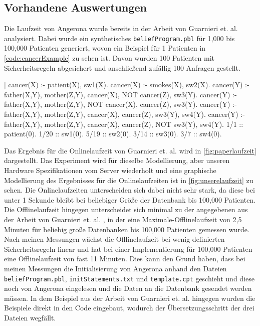 \documentclass[german,version-2020-11]{uzl-thesis}
\begin{document}
\subsection{Vorhandene Auswertungen}
Die Laufzeit von Angerona wurde bereits in der Arbeit von Guarnieri et. al. \cite{guarnieri2017securing} analysiert. Dabei wurde ein synthetisches \texttt{beliefProgram.pbl} für 1,000 bis 100,000 Patienten generiert, wovon ein Beispiel für 1 Patienten in \autoref{code:cancerExample} zu sehen ist. Davon wurden 100 Patienten mit Sicherheitsregeln abgesichert und anschließend zufällig 100 Anfragen gestellt. \\ 
\begin{Pseudocode}[caption={\texttt{beliefProgram.pbl} für das Beispiel aus \cite{6}}, label={code:cancerExample}]]
cancer(X) :- patient(X), sw1(X).
cancer(X) :- smokes(X), sw2(X).
cancer(Y) :- father(X,Y), mother(Z,Y), cancer(X), NOT cancer(Z), sw3(Y).
cancer(Y) :- father(X,Y), mother(Z,Y), NOT cancer(X), cancer(Z), sw3(Y).
cancer(Y) :- father(X,Y), mother(Z,Y), cancer(X), cancer(Z), sw3(Y), sw4(Y).
cancer(Y) :- father(X,Y), mother(Z,Y), cancer(X), cancer(Z), NOT sw3(Y), sw4(Y).
1/1 :: patient(0).
1/20 :: sw1(0).
5/19 :: sw2(0).
3/14 :: sw3(0).
3/7 :: sw4(0).
\end{Pseudocode}
Das Ergebnis für die Onlinelaufzeit von Guarnieri et. al. \cite{guarnieri2017securing} wird in \autoref{fig:paperlaufzeit} dargestellt. Das Experiment wird für dieselbe Modellierung, aber unseren Hardware Spezifikationen vom Server wiederholt und eine graphische Modellierung des Ergebnisses für die Onlinelaufzeiten ist in \autoref{fig:unserelaufzeit} zu sehen. Die Onlinelaufzeiten unterscheiden sich dabei nicht sehr stark, da diese bei unter 1 Sekunde bleibt bei beliebiger Größe der Datenbank bis 100,000 Patienten. \\
Die Offlinelaufzeit hingegen unterscheidet sich minimal zu der angegebenen aus der Arbeit von Guarnieri et. al. \cite{guarnieri2017securing}, in der eine Maximale-Offlinelaufzeit von 2,5 Minuten für beliebig große Datenbanken bis 100,000 Patienten gemessen wurde. Nach meinen Messungen wächst die Offlinelaufzeit bei wenig definierten Sicherheitsregeln linear und hat bei einer Implementierung für 100,000 Patienten eine Offlinelaufzeit von fast 11 Minuten. Dies kann den Grund haben, dass bei meinen Messungen die Initialisierung von Angerona anhand den Dateien \texttt{beliefProgram.pbl}, \texttt{initStatements.txt} und \texttt{template.cpt} geschieht und diese noch von Angerona eingelesen und die Daten an die Datenbank gesendet werden müssen. In dem Beispiel aus der Arbeit von Guarnieri et. al. \cite{guarnieri2017securing} hingegen wurden die Beispiele direkt in den Code eingebaut, wodurch der Übersetzungsschritt der drei Dateien wegfällt.\\  
\end{document}
